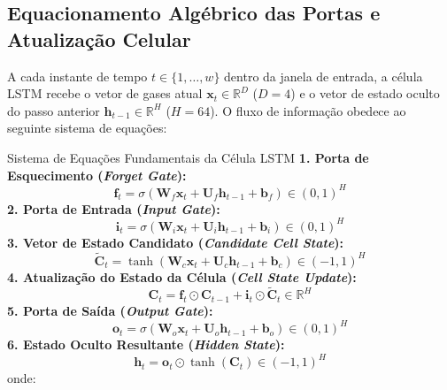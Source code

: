 \documentclass[11pt,a4paper]{article}
\begin{document}
\subsection{Equacionamento Algébrico das Portas e Atualização Celular}
A cada instante de tempo $t \in \{1, \dots, w\}$ dentro da janela de entrada, a célula LSTM recebe o vetor de gases atual $\mathbf{x}_t \in \mathbb{R}^D$ ($D=4$) e o vetor de estado oculto do passo anterior $\mathbf{h}_{t-1} \in \mathbb{R}^H$ ($H=64$). O fluxo de informação obedece ao seguinte sistema de equações:

\begin{mathBox}{Sistema de Equações Fundamentais da Célula LSTM}
\textbf{1. Porta de Esquecimento (\textit{Forget Gate}):}
\begin{equation}
  \mathbf{f}_t = \sigma\left( \mathbf{W}_f \mathbf{x}_t + \mathbf{U}_f \mathbf{h}_{t-1} + \mathbf{b}_f \right) \in (0, 1)^H
  \label{eq:forget_gate}
\end{equation}
\textbf{2. Porta de Entrada (\textit{Input Gate}):}
\begin{equation}
  \mathbf{i}_t = \sigma\left( \mathbf{W}_i \mathbf{x}_t + \mathbf{U}_i \mathbf{h}_{t-1} + \mathbf{b}_i \right) \in (0, 1)^H
  \label{eq:input_gate}
\end{equation}
\textbf{3. Vetor de Estado Candidato (\textit{Candidate Cell State}):}
\begin{equation}
  \tilde{\mathbf{C}}_t = \tanh\left( \mathbf{W}_c \mathbf{x}_t + \mathbf{U}_c \mathbf{h}_{t-1} + \mathbf{b}_c \right) \in (-1, 1)^H
  \label{eq:candidate_gate}
\end{equation}
\textbf{4. Atualização do Estado da Célula (\textit{Cell State Update}):}
\begin{equation}
  \mathbf{C}_t = \mathbf{f}_t \odot \mathbf{C}_{t-1} + \mathbf{i}_t \odot \tilde{\mathbf{C}}_t \in \mathbb{R}^H
  \label{eq:cell_update}
\end{equation}
\textbf{5. Porta de Saída (\textit{Output Gate}):}
\begin{equation}
  \mathbf{o}_t = \sigma\left( \mathbf{W}_o \mathbf{x}_t + \mathbf{U}_o \mathbf{h}_{t-1} + \mathbf{b}_o \right) \in (0, 1)^H
  \label{eq:output_gate}
\end{equation}
\textbf{6. Estado Oculto Resultante (\textit{Hidden State}):}
\begin{equation}
  \mathbf{h}_t = \mathbf{o}_t \odot \tanh(\mathbf{C}_t) \in (-1, 1)^H
  \label{eq:hidden_state}
\end{equation}
onde:
\begin{itemize}

\end{itemize}
\end{mathBox}
\end{document}
